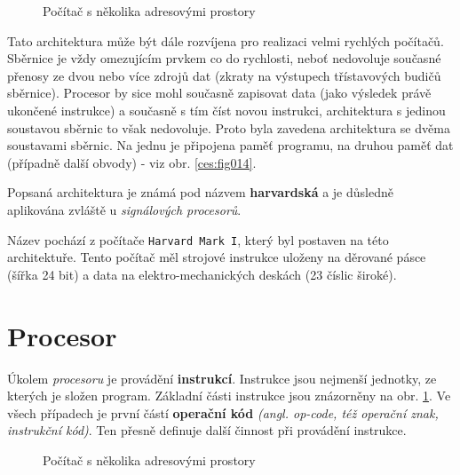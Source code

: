       \begin{figure}[ht!]
        \newline     
        \caption{Počítač s několika adresovými prostory}
      \end{figure}
      
      Tato architektura může být dále rozvíjena pro realizaci velmi rychlých počítačů. Sběrnice je 
      vždy omezujícím prvkem co do rychlosti, neboť nedovoluje současné přenosy ze dvou nebo více 
      zdrojů dat (zkraty na výstupech třístavových budičů sběrnice). Procesor by sice mohl současně 
      zapisovat data (jako výsledek právě ukončené instrukce) a současně s tím číst novou 
      instrukci, architektura s jedinou soustavou sběrnic to však nedovoluje. Proto byla zavedena 
      architektura se dvěma soustavami sběrnic. Na jednu je připojena paměť programu, na druhou 
      paměť dat (případně další obvody) - viz obr. \ref{ces:fig014}.

      
      Popsaná architektura je známá pod názvem \textbf{harvardská} a je důsledně aplikována zvláště 
      u \emph{signálových procesorů}.
      
      Název pochází z počítače \texttt{Harvard Mark I}, který byl postaven na této architektuře. 
      Tento počítač měl strojové instrukce uloženy na děrované pásce (šířka 24 bit) a data na 
      elektro-mechanických deskách (23 číslic široké).      
      
  \section{Procesor}\label{ces:IchapIVsecII}
    Úkolem \emph{procesoru} je provádění \textbf{instrukcí}. Instrukce jsou nej\-men\-ší jednotky, 
    ze 
    kterých je složen program. Základní části instrukce jsou znázorněny na obr. 
    \ref{ces:fig015}. Ve všech případech je první částí \textbf{operační kód} \emph{(angl. 
    op-code, též operační znak, instrukční kód)}. Ten přesně definuje další činnost při provádění 
    instrukce.
    \begin{figure}[ht!] 
                  \vspace{1em}
                  \vspace{1em}
      \caption{Počítač s několika adresovými prostory}
      \label{ces:fig015}
    \end{figure}

